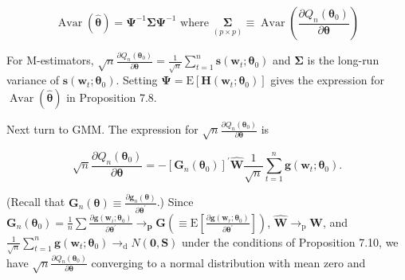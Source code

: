 \documentclass[10pt]{article}
\begin{document}
\begin{equation*}
\operatorname{Avar}(\hat{\boldsymbol{\theta}})=\boldsymbol{\Psi}^{-1} \boldsymbol{\Sigma} \boldsymbol{\Psi}^{-1} \text { where } \underset{(p \times p)}{\boldsymbol{\Sigma}} \equiv \operatorname{Avar}\left(\frac{\partial Q_{n}\left(\boldsymbol{\theta}_{0}\right)}{\partial \boldsymbol{\theta}}\right) \tag{7.3.44}
\end{equation*}


For M-estimators, $\sqrt{n} \frac{\partial Q_{n}\left(\boldsymbol{\theta}_{0}\right)}{\partial \boldsymbol{\theta}}=\frac{1}{\sqrt{n}} \sum_{t=1}^{n} \mathbf{s}\left(\mathbf{w}_{t} ; \boldsymbol{\theta}_{0}\right)$ and $\boldsymbol{\Sigma}$ is the long-run variance of $\mathbf{s}\left(\mathbf{w}_{t} ; \boldsymbol{\theta}_{0}\right)$. Setting $\boldsymbol{\Psi}=\mathrm{E}\left[\mathbf{H}\left(\mathbf{w}_{t} ; \boldsymbol{\theta}_{0}\right)\right]$ gives the expression for $\operatorname{Avar}(\hat{\boldsymbol{\theta}})$ in Proposition 7.8.

Next turn to GMM. The expression for $\sqrt{n} \frac{\partial Q_{n}\left(\boldsymbol{\theta}_{0}\right)}{\partial \boldsymbol{\theta}}$ is


\begin{equation*}
\sqrt{n} \frac{\partial Q_{n}\left(\boldsymbol{\theta}_{0}\right)}{\partial \boldsymbol{\theta}}=-\left[\mathbf{G}_{n}\left(\boldsymbol{\theta}_{0}\right)\right]^{\prime} \widehat{\mathbf{W}} \frac{1}{\sqrt{n}} \sum_{t=1}^{n} \mathbf{g}\left(\mathbf{w}_{t} ; \boldsymbol{\theta}_{0}\right) . \tag{7.3.45}
\end{equation*}


(Recall that $\mathbf{G}_{n}(\boldsymbol{\theta}) \equiv \frac{\partial \mathbf{g}_{n}(\boldsymbol{\theta})}{\partial \boldsymbol{\theta}^{\prime}}$.) Since $\mathbf{G}_{n}\left(\boldsymbol{\theta}_{0}\right)=\frac{1}{n} \sum \frac{\partial \mathbf{g}\left(\mathbf{w}_{i} ; \boldsymbol{\theta}_{0}\right)}{\partial \boldsymbol{\theta}^{\prime}} \rightarrow_{\mathbf{p}} \mathbf{G}\left(\equiv \mathrm{E}\left[\frac{\partial \mathbf{g}\left(\mathbf{w}_{r} ; \boldsymbol{\theta}_{0}\right)}{\partial \boldsymbol{\theta}^{\prime}}\right]\right)$, $\widehat{\mathbf{W}} \rightarrow_{\mathrm{p}} \mathbf{W}$, and $\frac{1}{\sqrt{n}} \sum_{t=1}^{n} \mathbf{g}\left(\mathbf{w}_{t} ; \boldsymbol{\theta}_{0}\right) \rightarrow_{\mathrm{d}} N(\mathbf{0}, \mathbf{S})$ under the conditions of Proposition 7.10, we have $\sqrt{n} \frac{\partial Q_{n}\left(\boldsymbol{\theta}_{0}\right)}{\partial \boldsymbol{\theta}}$ converging to a normal distribution with mean zero and
\end{document}
